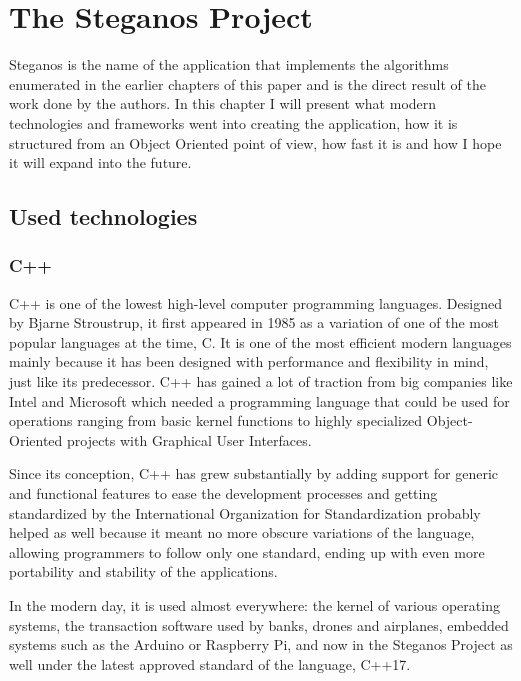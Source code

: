 
\chapter{The Steganos Project}
\begin{multicols}{2}
Steganos is the name of the application that implements the algorithms enumerated in the earlier chapters of this paper and is the direct result of the work done by the authors. In this chapter I will present what modern technologies and frameworks went into creating the application, how it is structured from an Object Oriented point of view, how fast it is and how I hope it will expand into the future.

\section{Used technologies}
\subsection{C++}
C++ is one of the lowest high-level computer programming languages. Designed by Bjarne Stroustrup, it first appeared in 1985 as a variation of one of the most popular languages at the time, C. It is one of the most efficient modern languages mainly because it has been designed with performance and flexibility in mind, just like its predecessor. C++ has gained a lot of traction  from big companies like Intel and Microsoft which needed a programming language that could be used for operations ranging from basic kernel functions to highly specialized Object-Oriented projects with Graphical User Interfaces\cite{stroustrup_2018}.

Since its conception, C++ has grew substantially by adding support for generic and functional features to ease the development processes and getting standardized by the International Organization for Standardization probably helped as well because it meant no more obscure variations of the language, allowing programmers to follow only one standard, ending up with even more portability and stability of the applications.

In the modern day, it is used almost everywhere: the kernel of various operating systems, the transaction software used by banks, drones and airplanes, embedded systems such as the Arduino or Raspberry Pi, and now in the Steganos Project as well under the latest approved standard of the language, C++17.


\end{multicols}
